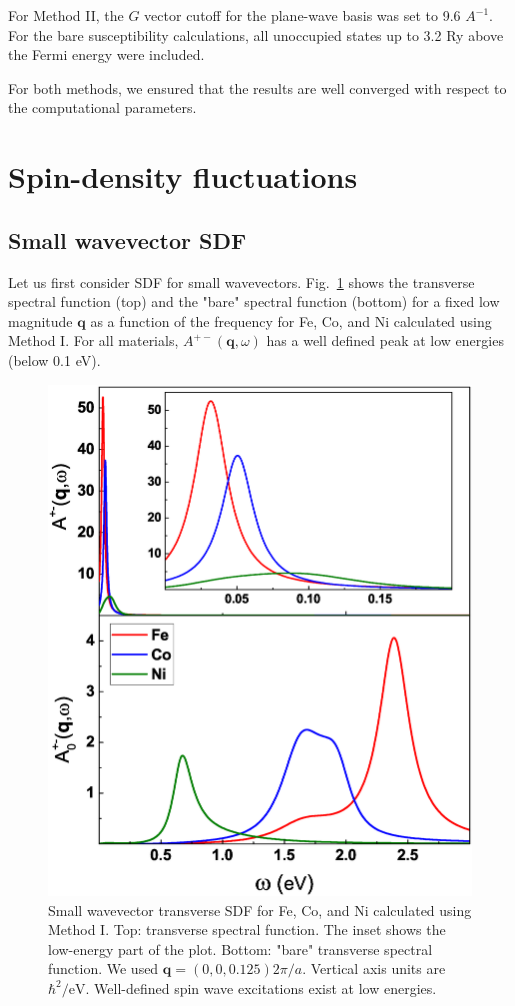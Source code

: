 For Method II, the $G$ vector cutoff for the plane-wave basis was set to 9.6 $A^{-1}$. For the bare susceptibility calculations, all unoccupied states up to 3.2 Ry above the Fermi energy were included. 

For both methods, we ensured that the results are well converged with respect to the computational parameters.

\FloatBarrier

\section{Spin-density fluctuations}



\subsection{Small wavevector SDF}

Let us first consider SDF for small wavevectors. Fig.~\ref{ApmLowQ} shows the transverse spectral function (top) and the "bare" spectral function (bottom) for a fixed low magnitude $\mathbf{q}$ as a function of the frequency for Fe, Co, and Ni calculated using Method I. For all materials, $A^{+-}(\mathbf{q},\omega)$ has a well defined peak at low energies (below 0.1 eV).

\begin{figure}[h!]
\centering
\includegraphics[width=0.5\hsize]{Chapters/TDDFT/figures/Article/ApmLowQ.eps}
\caption{Small wavevector transverse SDF for Fe, Co, and Ni calculated using Method I. Top: transverse spectral function. The inset shows the low-energy part of the plot. Bottom: "bare" transverse spectral function. We used $\mathbf{q}=(0,0,0.125)2\pi/a$. Vertical axis units are $\hbar^2/\text{eV}$. Well-defined spin wave excitations exist at low energies.}
\label{ApmLowQ}
\end{figure}

